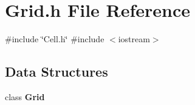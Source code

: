 \section{Grid.\+h File Reference}
\label{Grid_8h}
{\ttfamily \#include \char`\"{}Cell.\+h\char`\"{}}\newline
{\ttfamily \#include $<$iostream$>$}\newline
\subsection*{Data Structures}
\begin{DoxyCompactItemize}
\item 
class \textbf{ Grid}
\end{DoxyCompactItemize}
